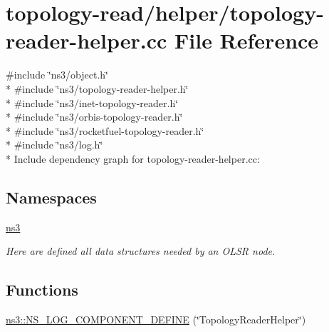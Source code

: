\hypertarget{topology-reader-helper_8cc}{}\section{topology-\/read/helper/topology-\/reader-\/helper.cc File Reference}
\label{topology-reader-helper_8cc}
{\ttfamily \#include \char`\"{}ns3/object.\+h\char`\"{}}\\*
{\ttfamily \#include \char`\"{}ns3/topology-\/reader-\/helper.\+h\char`\"{}}\\*
{\ttfamily \#include \char`\"{}ns3/inet-\/topology-\/reader.\+h\char`\"{}}\\*
{\ttfamily \#include \char`\"{}ns3/orbis-\/topology-\/reader.\+h\char`\"{}}\\*
{\ttfamily \#include \char`\"{}ns3/rocketfuel-\/topology-\/reader.\+h\char`\"{}}\\*
{\ttfamily \#include \char`\"{}ns3/log.\+h\char`\"{}}\\*
Include dependency graph for topology-\/reader-\/helper.cc\+:
\subsection*{Namespaces}
\begin{DoxyCompactItemize}
\item 
 \hyperlink{namespacens3}{ns3}
\begin{DoxyCompactList}\small\item\em Here are defined all data structures needed by an O\+L\+SR node. \end{DoxyCompactList}\end{DoxyCompactItemize}
\subsection*{Functions}
\begin{DoxyCompactItemize}
\item 
\hyperlink{namespacens3_a948520ab32ddf886bfd10133019e20d6}{ns3\+::\+N\+S\+\_\+\+L\+O\+G\+\_\+\+C\+O\+M\+P\+O\+N\+E\+N\+T\+\_\+\+D\+E\+F\+I\+NE} (\char`\"{}Topology\+Reader\+Helper\char`\"{})
\end{DoxyCompactItemize}
